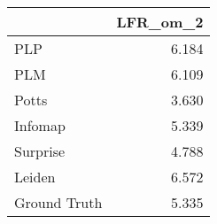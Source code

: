 \begin{tabular}{lr}
\toprule
{} & LFR_om_2 \\
\midrule
PLP          &    6.184 \\
PLM          &    6.109 \\
Potts        &    3.630 \\
Infomap      &    5.339 \\
Surprise     &    4.788 \\
Leiden       &    6.572 \\
Ground Truth &    5.335 \\
\bottomrule
\end{tabular}

